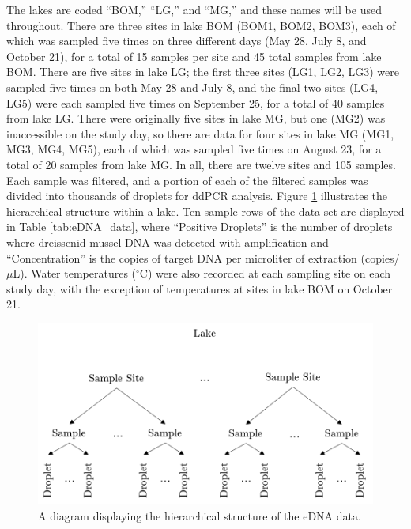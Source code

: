 \documentclass[12pt]{article}\usepackage[]{graphicx}\usepackage[]{color}
\begin{document}
The lakes are coded ``BOM,'' ``LG,'' and ``MG,'' and these names will be used throughout. There are three sites in lake BOM (BOM1, BOM2, BOM3), each of which was sampled five times on three different days (May 28, July 8, and October 21), for a total of 15 samples per site and 45 total samples from lake BOM. There are five sites in lake LG; the first three sites (LG1, LG2, LG3) were sampled five times on both May 28 and July 8, and the final two sites (LG4, LG5) were each sampled five times on September 25, for a total of 40 samples from lake LG. There were originally five sites in lake MG, but one (MG2) was inaccessible on the study day, so there are data for four sites in lake MG (MG1, MG3, MG4, MG5), each of which was sampled five times on August 23, for a total of 20 samples from lake MG. In all, there are twelve sites and 105 samples. Each sample was filtered, and a portion of each of the filtered samples was divided into thousands of droplets for ddPCR analysis. Figure \ref{fig:eDNA_diagram} illustrates the hierarchical structure within a lake. Ten sample rows of the data set are displayed in Table \ref{tab:eDNA_data}, where ``Positive Droplets'' is the number of droplets where dreissenid mussel DNA was detected with amplification and ``Concentration'' is the copies of target DNA per microliter of extraction (copies/$\mu$L). Water temperatures ($^\circ$C) were also recorded at each sampling site on each study day, with the exception of temperatures at sites in lake BOM on October 21. 

\begin{figure}[]
	\centering
	\includegraphics[scale = 0.7]{images/eDNA}
	\caption{A diagram displaying the hierarchical structure of the eDNA data.}
	\label{fig:eDNA_diagram}
\end{figure}
\end{document}
